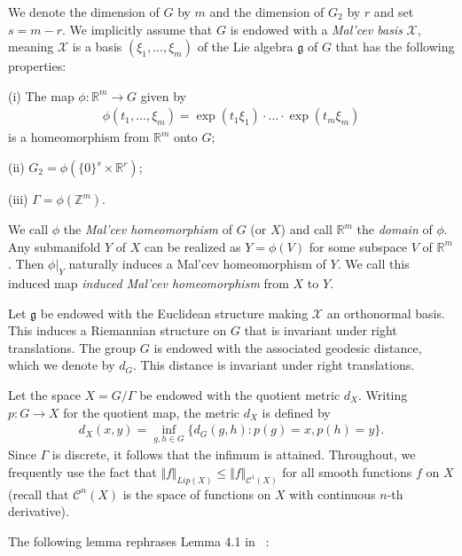 \documentclass[12pt,amstex]{amsart}
\theoremstyle{definition}
\begin{document}
We denote the dimension of $G$ by $m$ and the dimension of $G_{2}$ by $r$ and set $s=m-r$. We implicitly assume that $G$ is endowed with a \emph{Mal'cev basis} $\mathcal{X}$, meaning $\mathcal{X}$ is a basis $(\xi_{1},\dots,\xi_{m})$ of the Lie algebra $\mathfrak{g}$ of $G$ that has the following properties:

(i) The map $\phi\colon \mathbb{R}^{m}\rightarrow G$ given by
\begin{equation}\nonumber
  \begin{split}
    \phi(t_{1},\dots,\xi_{m})=\exp(t_{1}\xi_{1})\cdot\ldots\cdot\exp(t_{m}\xi_{m})
  \end{split}
\end{equation}
is a homeomorphism from $\mathbb{R}^{m}$ onto $G$;

(ii) $G_{2}=\phi(\{0\}^{s}\times\mathbb{R}^{r})$;

(iii) $\Gamma=\phi(\mathbb{Z}^{m})$.

  We call $\phi$ the \emph{Mal'cev homeomorphism} of $G$ (or $X$) and call $\mathbb{R}^{m}$ the \emph{domain} of $\phi$. Any submanifold $Y$ of $X$ can be realized as $Y=\phi(V)$ for some subspace $V$ of $\mathbb{R}^{m}$. Then $\phi|_{Y}$ naturally induces a Mal'cev homeomorphism of $Y$. We call this induced map \emph{induced Mal'cev homeomorphism} from $X$ to $Y$.

Let $\mathfrak{g}$ be endowed with the Euclidean structure making $\mathcal{X}$ an orthonormal basis. This induces a Riemannian structure on $G$ that is invariant under right translations. The group $G$ is endowed with the associated geodesic distance, which we denote by $d_{G}$. This distance is invariant under right translations.

Let the space $X=G/\Gamma$ be endowed with the quotient metric $d_{X}$. Writing $p\colon G\rightarrow X$ for the quotient map, the metric $d_{X}$ is defined by
    \begin{equation}\nonumber
  \begin{split}
  d_{X}(x,y)=\inf_{g,h\in G}\{d_{G}(g,h)\colon p(g)=x, p(h)=y\}.
  \end{split}
\end{equation}
Since $\Gamma$ is discrete, it follows that the infimum is attained. 
Throughout, we frequently use the fact that 
$\Vert f\Vert_{Lip(X)}\leq \Vert f\Vert_{\mathcal{C}^{1}(X)}$ for all smooth functions $f$ on $X$ (recall that $\mathcal{C}^{n}(X)$ is the space of functions on $X$ with continuous $n$-th derivative).


The following lemma rephrases Lemma 4.1 in ~\cite{FH}:
\end{document}
